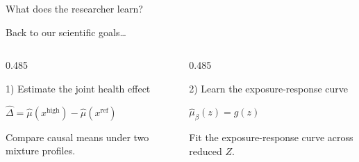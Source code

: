 \documentclass[
  ignorenonframetext,
  aspectratio=169,
  11pt]{beamer}
\begin{document}
\begin{frame}{What does the researcher learn?}
\label{what-does-the-researcher-learn}
\vspace{-0.06cm}

{\centering
\small\textcolor{secondarygray}{Back to our scientific goals\ldots}\par}

\vspace{0.06cm}

\begin{columns}[T,onlytextwidth]
\begin{column}{0.485\textwidth}
\begin{block}{1) Estimate the joint health effect}
\begin{minipage}[t][1.78cm][t]{\linewidth}
\centering
\vspace*{0.08cm}
\parbox[c][0.76cm][c]{\linewidth}{\centering\Large
  \(\displaystyle
    \widehat\Delta
    =\widehat\mu\!\left(x^{\scriptscriptstyle\mathrm{high}}\right)
    -\widehat\mu\!\left(x^{\scriptscriptstyle\mathrm{ref}}\right)
  \)}
\par
\vspace{0.08cm}
\parbox[c][0.64cm][c]{0.94\linewidth}{\centering\scriptsize
  \textcolor{secondarygray}{Compare causal means under two mixture profiles.}}
\end{minipage}
\end{block}
\end{column}

\begin{column}{0.485\textwidth}
\begin{block}{2) Learn the exposure-response curve}
\begin{minipage}[t][1.78cm][t]{\linewidth}
\centering
\vspace*{0.08cm}
\parbox[c][0.76cm][c]{\linewidth}{\centering\Large
  \(\displaystyle \widehat\mu_\beta(z)=\widehat g(z)\)}
\par
\vspace{0.08cm}
\parbox[c][0.64cm][c]{0.94\linewidth}{\centering\scriptsize
  \textcolor{secondarygray}{Fit the exposure-response curve across reduced \(Z\).}}
\end{minipage}
\end{block}
\end{column}
\end{columns}

\vspace{0.22cm}


\end{frame}
\end{document}
